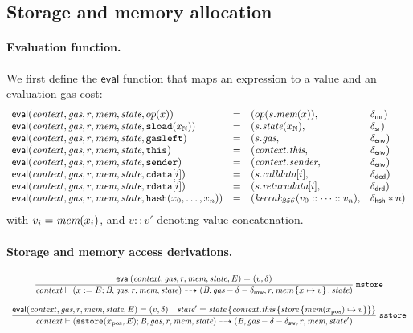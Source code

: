 \def\eval{\mathsf{eval}}
\subsection{Storage and memory allocation}\label{sec:alloc}

\paragraph{Evaluation function.}
We first define the $\eval$ function that maps an expression to a value and an evaluation gas cost:
$$
\begin{array}{llll}
    \eval(\ctx, \textit{gas},r,\memory,\state, op(x)) &=& 
    (op(s.\memory(x)),&\dmr) \\
    \eval(\ctx, \textit{gas},r,\memory,\state, \sload{x_\Uint}) &=& (s.\state(x_\Uint),&\dsr)\\
    \eval(\ctx, \textit{gas}, r,\memory,\state, \mathtt{gasleft}) &=& (s.\textit{gas},&\denv) \\
    \eval(\ctx,\textit{gas}, r,\memory,\state,\mathtt{this}) &=& (\ctx.\thisVal,&\denv) \\
    \eval(\ctx, \textit{gas}, r,\memory,\state, \mathtt{sender}) &=& (\ctx.\senderVal,&\denv) \\
    \eval(\ctx, \textit{gas}, r,\memory,\state,\bcd[i]) &=& (s.\callDataVal[i],&\dcd) \\
    \eval(\ctx, \textit{gas}, r,\memory,\state,\brd[i]) &=& (s.\returnDataVal[i],&\drd) \\
    \eval(\ctx, \textit{gas}, r,\memory,\state, \hsh{x_0,\dots,x_n}) &=& (\mathit{keccak_{256}}(v_0::\dots::v_n), &\dhsh*n)
\end{array}
$$
with $v_i=\textit{mem}(x_i)$, and $v::v'$ denoting value concatenation.
 
\paragraph{Storage and memory access derivations.}

$$
\begin{array}{c}
\dfrac{
\eval(\ctx,\textit{gas}, r,\memory,\state,E) = (v,\delta) 
}
{
\ctx\vdash 
(x:=E;\bytecode,\textit{gas}, r, \memory,\state) 
\rar 
(\bytecode,\textit{gas}-\delta-\delta_\mathsf{mw}, r,\memory\set{x\mapsto v},\state)
}\rlab{mstore}
\\\\
\dfrac{
\eval(\ctx,\textit{gas}, r,\memory,\state,E) = (v,\delta)
\quad
\state' = \state\set{\ctx.\thisVal\set{\store\set{\memory(x_{\rm pos})\mapsto v}}}
}
{
\ctx\vdash 
(\sstore{x_{\rm pos},E};\bytecode,\textit{gas}, r, \memory,\state) 
\rar  
(\bytecode,\textit{gas}-\delta-\delta_\mathsf{sw}, r,\memory,\state')
}\rlab{sstore}
\end{array}
$$
